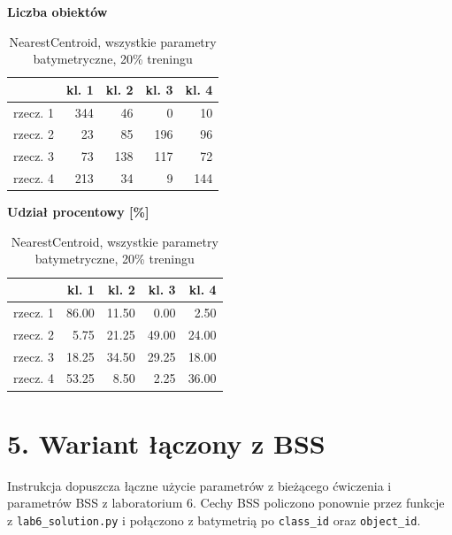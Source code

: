 \documentclass[11pt,a4paper]{article}
\begin{document}
\begin{table}[H]
\centering
\small
\caption{NearestCentroid, wszystkie parametry batymetryczne, 20\% treningu}
\begin{minipage}{0.47\textwidth}
\centering
\textbf{Liczba obiektów}\\[0.35em]
\begin{tabular}{lrrrr}
\toprule
 & kl. 1 & kl. 2 & kl. 3 & kl. 4 \\
\midrule
rzecz. 1 & 344 & 46 & 0 & 10 \\
rzecz. 2 & 23 & 85 & 196 & 96 \\
rzecz. 3 & 73 & 138 & 117 & 72 \\
rzecz. 4 & 213 & 34 & 9 & 144 \\
\bottomrule
\end{tabular}
\end{minipage}\hfill
\begin{minipage}{0.47\textwidth}
\centering
\textbf{Udział procentowy [\%]}\\[0.35em]
\begin{tabular}{lrrrr}
\toprule
 & kl. 1 & kl. 2 & kl. 3 & kl. 4 \\
\midrule
rzecz. 1 & 86.00 & 11.50 & 0.00 & 2.50 \\
rzecz. 2 & 5.75 & 21.25 & 49.00 & 24.00 \\
rzecz. 3 & 18.25 & 34.50 & 29.25 & 18.00 \\
rzecz. 4 & 53.25 & 8.50 & 2.25 & 36.00 \\
\bottomrule
\end{tabular}
\end{minipage}
\end{table}


\section*{5. Wariant łączony z BSS}
Instrukcja dopuszcza łączne użycie parametrów z bieżącego ćwiczenia i parametrów BSS z laboratorium 6. Cechy BSS policzono ponownie przez funkcje z \texttt{lab6\_solution.py} i połączono z batymetrią po \texttt{class\_id} oraz \texttt{object\_id}.
\end{document}
